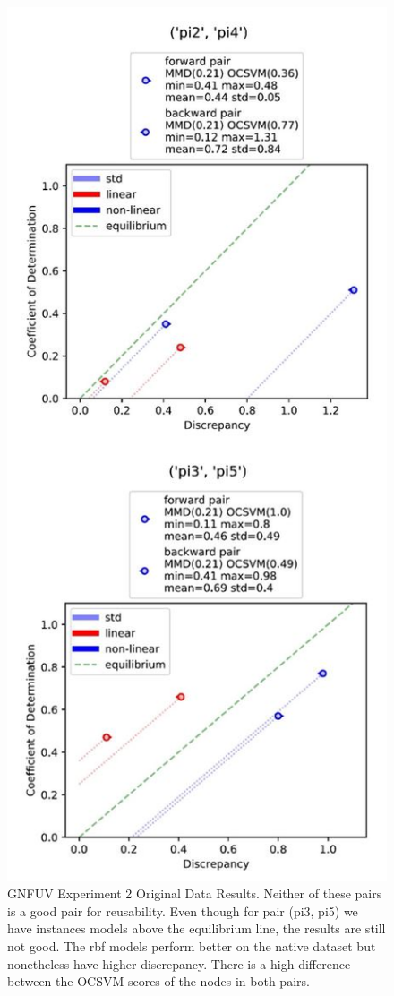 \documentclass{mpaper}
\begin{document}
\begin{figure}[]
    \begin{center}
        \includegraphics[scale = 0.6]{experiment_2.jpg}
    \end{center}
    \caption{GNFUV Experiment 2 Original Data Results. Neither of these pairs is a good pair for reusability. Even though for pair (pi3, pi5) we have instances models above the equilibrium line, the results are still not good. The rbf models perform better on the native dataset but nonetheless have higher discrepancy. There is a high difference between the OCSVM scores of the nodes in both pairs.}
    \label{fig:gnfuv_exp2}
\end{figure}
\end{document}

